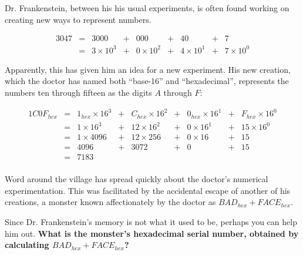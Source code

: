 

Dr. Frankenstein, between his his usual experiments,
is often found working on creating new ways to represent numbers.


{\Large
\[
  \begin{array}{rcccccccc}
  3047 & = & 3000 &+& 000 &+& 40 &+& 7 \\
       & = & 3\times10^3 &+& 0\times10^2 &+& 4\times10^1 &+& 7\times10^0
  \end{array}
\]
}

Apparently, this has given him an idea for a new experiment.
 His new creation, which the
doctor has named both ``base-16'' and ``hexadecimal'', represents the numbers
ten through fifteen as the digits \(A\) through \(F\):

{\Large
\[
  \begin{array}{rcccccccc}
  1C0F_{hex} & = & 1_{hex}\times16^3 &+& C_{hex}\times16^2 &+& 0_{hex}\times16^1 &+& F_{hex}\times16^0 \\
             & = & 1\times16^3 &+& 12\times16^2 &+& 0\times16^1 &+& 15\times16^0 \\
             & = & 1\times4096 &+& 12\times256 &+& 0\times16 &+& 15 \\
             & = & 4096 &+& 3072 &+& 0 &+& 15 \\
             & = & 7183\\
  \end{array}
\]
}

Word around the village has spread quickly about the doctor's numerical
experimentation. This was facilitated by the accidental escape of another
of his creations, a monster known affectionately by the doctor as
\(BAD_{hex}+FACE_{hex}\).


Since Dr. Frankenstein's memory is not what it used to be, perhaps you can
help him out. \textbf{What is the monster's hexadecimal serial number, obtained
by calculating \(BAD_{hex}+FACE_{hex}\)?}

